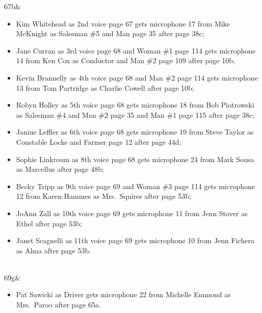67b&\begin{itemize}
\item Kim Whitehead as 2nd voice page 67 gets microphone 17 from Mike McKnight as Salesman \#5 and Man page 35 after page 38c;
\item Jane Curran as 3rd voice page 68 and Woman \#1 page 114 gets microphone 14 from Ken Cox as Conductor and Man \#2 page 109 after page 10b;
\item Kevin Brannelly as 4th voice page 68 and Man \#2 page 114 gets microphone 13 from Tom Partridge as Charlie Cowell after page 10b;
\item Robyn Holley as 5th voice page 68 gets microphone 18 from Bob Piotrowski as Salesman \#4 and Man \#2 page 35 and Man \#1 page 115 after page 38c;
\item Janine Leffler as 6th voice page 68 gets microphone 19 from Steve Taylor as Constable Locke and Farmer page 12 after page 44d;
\item Sophie Linkroum as 8th voice page 68 gets microphone 24 from Mark Sousa as Marcellus after page 48b;
\item Becky Tripp as 9th voice page 69 and Woman \#3 page 114 gets microphone 12 from Karen Hammes as Mrs.~Squires after page 53b;
\item JoAnn Zall as 10th voice page 69 gets microphone 11 from Jenn Stover as Ethel after page 53b;
\item Janet Scagnelli as 11th voice page 69 gets microphone 10 from Jenn Fichera as Alma after page 53b.
\end{itemize}\\\hline
69g&\begin{itemize}
\item Pat Sawicki as Driver gets microphone 22 from Michelle Emmond as Mrs.~Paroo after page 65a.
\end{itemize}\\\hline
